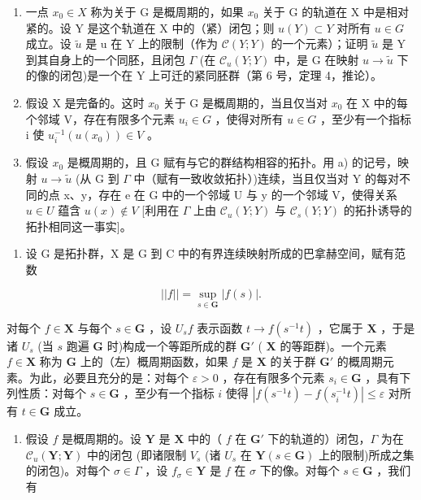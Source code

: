 \begin{enumerate}
\def\labelenumi{\alph{enumi})}
\item
  一点 \(x_{0} \in X\) 称为关于 G 是概周期的，如果 \(x_{0}\) 关于 G 的轨道在 X 中是相对紧的。设 Y 是这个轨道在 X 中的（紧）闭包；则 \(u(Y) \subset Y\) 对所有 \(u \in G\) 成立。设 \(\tilde{u}\) 是 u 在 Y 上的限制（作为 \(\mathcal{C}(Y; Y)\) 的一个元素）；证明 \(\tilde{u}\) 是 Y 到其自身上的一个同胚，且闭包 \(\Gamma\) (在 \(\mathcal{C}_{u}(Y; Y)\) 中，是 G 在映射 \(u \to \tilde{u}\) 下的像的闭包)是一个在 Y 上可迁的紧同胚群（第 6 号，定理 4，推论）。
\item
  假设 X 是完备的。这时 \(x_{0}\) 关于 G 是概周期的，当且仅当对 \(x_{0}\) 在 X 中的每个邻域 V，存在有限多个元素 \(u_{i} \in G\) ，使得对所有 \(u \in G\) ，至少有一个指标 i 使 \(u_{i}^{-1}(u(x_{0})) \in V\) 。
\item
  假设 \(x_{0}\) 是概周期的，且 G 赋有与它的群结构相容的拓扑。用 a) 的记号，映射 \(u \to \tilde{u}\) (从 G 到 \(\Gamma\) 中（赋有一致收敛拓扑）)连续，当且仅当对 Y 的每对不同的点 x、y，存在 e 在 G 中的一个邻域 U 与 y 的一个邻域 V，使得关系 \(u \in U\) 蕴含 \(u(x) \notin V\) {[}利用在 \(\Gamma\) 上由 \(\mathcal{C}_{u}(Y; Y)\) 与 \(\mathcal{C}_{s}(Y; Y)\) 的拓扑诱导的拓扑相同这一事实{]}。
\end{enumerate}

\begin{enumerate}
\def\labelenumi{\arabic{enumi})}
\setcounter{enumi}{27}
\tightlist
\item
  设 G 是拓扑群，X 是 G 到 C 中的有界连续映射所成的巴拿赫空间，赋有范数
\end{enumerate}

\[
\left| \left| f \right| \right| = \sup _ {s \in \mathbf {G}} | f (s) |.
\]

对每个 \(f \in \mathbf{X}\) 与每个 \(s \in \mathbf{G}\) ，设 \(U_s f\) 表示函数 \(t \to f(s^{-1}t)\) ，它属于 \(\mathbf{X}\) ，于是诸 \(U_s\) (当 \(s\) 跑遍 \(\mathbf{G}\) 时)构成一个等距所成的群 \(\mathbf{G}'\) ( \(\mathbf{X}\) 的等距群)。一个元素 \(f \in \mathbf{X}\) 称为 \(\mathbf{G}\) 上的（左）概周期函数，如果 \(f\) 是 \(\mathbf{X}\) 的关于群 \(\mathbf{G}'\) 的概周期元素。为此，必要且充分的是：对每个 \(\varepsilon > 0\) ，存在有限多个元素 \(s_i \in \mathbf{G}\) ，具有下列性质：对每个 \(s \in \mathbf{G}\) ，至少有一个指标 \(i\) 使得 \(|f(s^{-1}t) - f(s_{i}^{-1}t)| \leqslant \varepsilon\) 对所有 \(t \in \mathbf{G}\) 成立。

\begin{enumerate}
\def\labelenumi{\alph{enumi})}
\tightlist
\item
  假设 \(f\) 是概周期的。设 \(\mathbf{Y}\) 是 \(\mathbf{X}\) 中的（ \(f\) 在 \(\mathbf{G}'\) 下的轨道的）闭包，\(\Gamma\) 为在 \(\mathcal{C}_u(\mathbf{Y};\mathbf{Y})\) 中的闭包 (即诸限制 \(V_s\) (诸 \(U_s\) 在 \(\mathbf{Y} (s\in \mathbf{G})\) 上的限制)所成之集的闭包)。对每个 \(\sigma \in \Gamma\) ，设 \(f_{\sigma}\in \mathbf{Y}\) 是 \(f\) 在 \(\sigma\) 下的像。对每个 \(s\in \mathbf{G}\) ，我们有
\end{enumerate}

